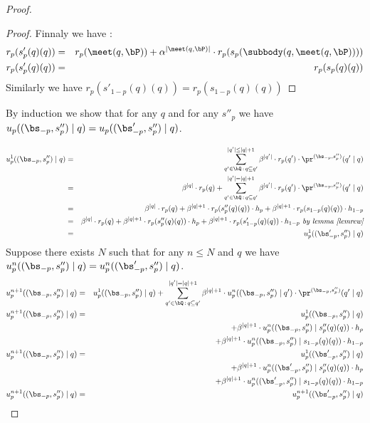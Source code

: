 \begin{proof}
\begin{proof}
	Finnaly we have :
	\begin{eqnarray*}
		r_p(s'_p(q)(q)) &= & r_p(\meet(q,\bP)) + \alpha^{|\meet(q,\bP)|} \cdot r_p(s_p(\subbody(q,\meet(q,\bP)))) \\
		r_p(s'_p(q)(q)) &= & r_p(s_p(q)(q))
	\end{eqnarray*}
Similarly we have $r_p(s'_{1-p}(q)(q)) =  r_p(s_{1-p}(q)(q))$
\end{proof}

By induction we show that for any $q$ and for any $s''_p$ we have $u_p( (\bs_{-p},s''_p) \mid q) = u_p( (\bs'_{-p},s''_p) \mid q)$.

\begin{eqnarray*}
	u_p^{1}( (\bs_{-p},s''_p) \mid q) & = & \sum_{q' \in \bQ \,:\, q \subseteq q'}^{|q'| \leq |q|+1} \beta^{|q'|} \cdot  r_p(q') \cdot \pr^{(\bs_{-p},s''_p)}(q' \mid q) \\ 
	& = &  \beta^{|q|} \cdot  r_p(q) + \sum_{q' \in \bQ \,:\, q \subseteq q'}^{|q'| = |q|+1} \beta^{|q'|} \cdot  r_p(q') \cdot \pr^{(\bs_{-p},s''_p)}(q' \mid q)\\ 
	& = & \beta^{|q|} \cdot  r_p(q) + \beta^{|q|+1} \cdot  r_p(s''_p(q)(q)) \cdot h_p + \beta^{|q|+1} \cdot  r_p(s_{1-p}(q)(q)) \cdot h_{1-p}\\
	& = & \beta^{|q|} \cdot  r_p(q) + \beta^{|q|+1} \cdot  r_p(s''_p(q)(q)) \cdot h_p + \beta^{|q|+1} \cdot  r_p(s'_{1-p}(q)(q)) \cdot h_{1-p} \textit{ by lemma \ref{lemrew}}  \\
	& = & u_p^{1}( (\bs'_{-p},s''_p) \mid q)
\end{eqnarray*}
Suppose there exists $N$ such that for any $n \leq N$ and $q$ we have $u_p^n( (\bs_{-p},s''_p) \mid q) = u_p^n( (\bs'_{-p},s''_p) \mid q)$.
\begin{eqnarray*}
	u_p^{n+1}( (\bs_{-p},s''_p) \mid q) & = & u_p^1((\bs_{-p},s''_p) \mid q) + \sum_{q' \in \bQ \,:\, q \subseteq q'}^{|q'| = |q|+1} \beta^{|q|+1} \cdot  u_p^{n}((\bs_{-p},s''_p) \mid q') \cdot \pr^{(\bs_{-p},s''_p)}(q' \mid q) \\
	u_p^{n+1}( (\bs_{-p},s''_p) \mid q) & = & u_p^1((\bs_{-p},s''_p) \mid q) \\
	&& +  \beta^{|q|+1} \cdot  u_p^{n}((\bs_{-p},s''_p) \mid s''_p(q)(q)) \cdot h_p \\
	&&+ \beta^{|q|+1} \cdot  u_p^{n}((\bs_{-p},s''_p) \mid s_{1-p}(q)(q)) \cdot h_{1-p} \\
	u_p^{n+1}( (\bs_{-p},s''_p) \mid q) & = & u_p^1((\bs'_{-p},s''_p) \mid q) \\
	&& +  \beta^{|q|+1} \cdot  u_p^{n}((\bs'_{-p},s''_p) \mid s''_p(q)(q)) \cdot h_p \\
	&&+ \beta^{|q|+1} \cdot  u_p^{n}((\bs'_{-p},s''_p) \mid s_{1-p}(q)(q)) \cdot h_{1-p} \\
	u_p^{n+1}( (\bs_{-p},s''_p) \mid q) & = & u_p^{n+1}( (\bs'_{-p},s''_p) \mid q) \\
\end{eqnarray*}





\end{proof}
